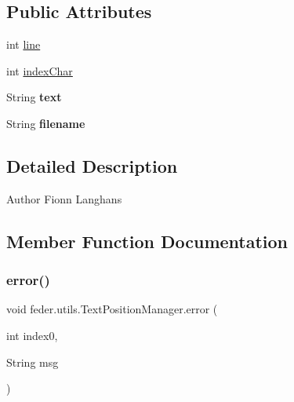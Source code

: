 \subsection*{Public Attributes}
\begin{DoxyCompactItemize}
\item 
int \hyperlink{classfeder_1_1utils_1_1TextPositionManager_adf4d8e39cd4d86526eebcce2f467bb9c}{line}
\item 
int \hyperlink{classfeder_1_1utils_1_1TextPositionManager_a3210bdef9fb20fe3f3ce274a93570f9c}{index\+Char}
\item 
\mbox{\label{classfeder_1_1utils_1_1TextPositionManager_a52c3cb7667ecaa94415a8d5df1e76ae4}} 
String {\bfseries text}
\item 
\mbox{\label{classfeder_1_1utils_1_1TextPositionManager_a207c89840a24cd3cc44dfd78ef4b45ef}} 
String {\bfseries filename}
\end{DoxyCompactItemize}


\subsection{Detailed Description}
\begin{DoxyAuthor}{Author}
Fionn Langhans 
\end{DoxyAuthor}


\subsection{Member Function Documentation}
\mbox{\label{classfeder_1_1utils_1_1TextPositionManager_a4fe9eadc4774d2a484055733b7a92427}} 
\subsubsection{\texorpdfstring{error()}{error()}}
{\footnotesize\ttfamily void feder.\+utils.\+Text\+Position\+Manager.\+error (\begin{DoxyParamCaption}\item[{int}]{index0,  }\item[{String}]{msg }\end{DoxyParamCaption})}

